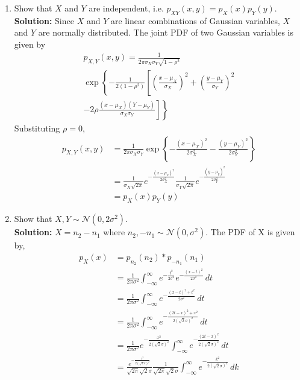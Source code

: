 \documentclass[journal,10pt,twocolumn]{IEEEtran}
\providecommand{\brak}[1]{\ensuremath{\left(#1\right)}}
\providecommand{\cbrak}[1]{\ensuremath{\left\{#1\right\}}}
\newcommand{\solution}{\noindent \textbf{Solution: }}
\providecommand{\gauss}[2]{\mathcal{N}\ensuremath{\left(#1,#2\right)}}
\begin{document}
\begin{enumerate}
\begin{enumerate}[label=(\alph{enumii})]
\item Show that $X$ and $Y$ are independent, i.e. $p_{XY}(x,y) = p_{X}(x)p_{Y}(y)$.\\
\solution Since $X$ and $Y$ are linear combinations of Gaussian variables, $X$ and $Y$ are normally distributed. The joint PDF of two Gaussian %
variables is given by
\begin{multline}
	\label{eq:biv_gauss_gen}
	p_{X,Y}\brak{x,y} = \frac{1}{2\pi\sigma_X\sigma_Y\sqrt{1-\rho^2}}\\
	\exp\left\{-\frac{1}{2\brak{1-\rho^2}}\left[\brak{\frac{x-\mu_X}{\sigma_X}}^2+\brak{\frac{y-\mu_Y}{\sigma_Y}}^2\right.\right.\\
	\left.\left.-2\rho\frac{\brak{x-\mu_X}\brak{Y-\mu_Y}}{\sigma_X\sigma_Y}\right]\right\}
\end{multline}
Substituting $\rho = 0$,  
\begin{align}
	p_{X,Y}\brak{x,y} &= \frac{1}{2\pi\sigma_X\sigma_Y}\exp\cbrak{-\frac{\brak{x-\mu_X}^2}{2\sigma_X^2}-\frac{\brak{y-\mu_Y}^2}{2\sigma_Y^2}}\\
	&= \frac{1}{\sigma_X\sqrt{2\pi}}e^{-\frac{\brak{x-\mu_x}^2}{2\sigma_X^2}} \frac{1}{\sigma_Y\sqrt{2\pi}}e^{-\frac{\brak{y-\mu_y}^2}{2\sigma_Y^2}}\\
	&= p_X\brak{x} p_Y\brak{y}
\end{align}
\item Show that $X,Y \sim \mathcal{N}\brak{0,2\sigma^2}$.\\
\solution $X = n_2-n_1$ where $n_2, -n_1 \sim \gauss{0}{\sigma^2}$. The PDF of X is given by,
\begin{align}
	\nonumber
	p_X(x) &= p_{n_2}(n_2) \ast p_{-n_1}(n_1)\\\nonumber
	&= \frac{1}{2\pi\sigma^2}\int_{-\infty}^{\infty} e^{-\frac{t^2}{2\sigma^2}}e^{-\frac{(x-t)^2}{2\sigma^2}}  \,dt\\\nonumber
	&= \frac{1}{2\pi\sigma^2}\int_{-\infty}^{\infty} e^{-\frac{(x-t)^2+t^2}{2\sigma^2}}  \,dt\\\nonumber
	&= \frac{1}{2\pi\sigma^2}\int_{-\infty}^{\infty} e^{-\frac{(2t-x)^2+x^2}{2(\sqrt{2}\sigma)^2}}  \,dt\\\nonumber
	&= \frac{1}{2\pi\sigma^2}e^{-\frac{x^2}{2(\sqrt{2}\sigma)^2}}\int_{-\infty}^{\infty} e^{-\frac{(2t-x)^2}{2(\sqrt{2}\sigma)^2}}  \,dt\\\nonumber
	&= \frac{e^{-\frac{x^2}{2(\sqrt{2}\sigma)^2}}}{\sqrt{2\pi}\sqrt{2}\sigma} \frac{1}{\sqrt{2\pi}\sqrt{2}\sigma}\int_{-\infty}^{\infty} e^{-\frac{k^2}{2(\sqrt{2}\sigma)^2}}  \,dk\\

\end{align}
\end{enumerate}
\end{enumerate}
\end{document}
